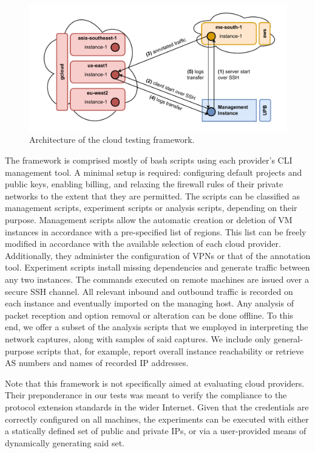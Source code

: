 \begin{figure}[htb]
    \centering
    \includegraphics[width=0.8 \textwidth,keepaspectratio]{figures/architecture.pdf}
    \caption{Architecture of the cloud testing framework.}
    \label{extend:ops:fig:architecture}
\end{figure}

The framework is comprised mostly of bash scripts using each provider's CLI management tool. A minimal setup is required: configuring default projects and public keys, enabling billing, and relaxing the firewall rules of their private networks to the extent that they are permitted. The scripts can be classified as management scripts, experiment scripts or analysis scripts, depending on their purpose. Management scripts allow the automatic creation or deletion of VM instances in accordance with a pre-specified list of regions. This list can be freely modified in accordance with the available selection of each cloud provider. Additionally, they administer the configuration of VPNs or that of the annotation tool. Experiment scripts install missing dependencies and generate traffic between any two instances. The commands executed on remote machines are issued over a secure SSH channel. All relevant inbound and outbound traffic is recorded on each instance and eventually imported on the managing host. Any analysis of packet reception and option removal or alteration can be done offline. To this end, we offer a subset of the analysis scripts that we employed in interpreting the network captures, along with samples of said captures. We include only general-purpose scripts that, for example, report overall instance reachability or retrieve AS numbers and names of recorded IP addresses.

Note that this framework is not specifically aimed at evaluating cloud providers. Their preponderance in our tests was meant to verify the compliance to the protocol extension standards in the wider Internet. Given that the credentials are correctly configured on all machines, the experiments can be executed with either a statically defined set of public and private IPs, or via a user-provided means of dynamically generating said set.

